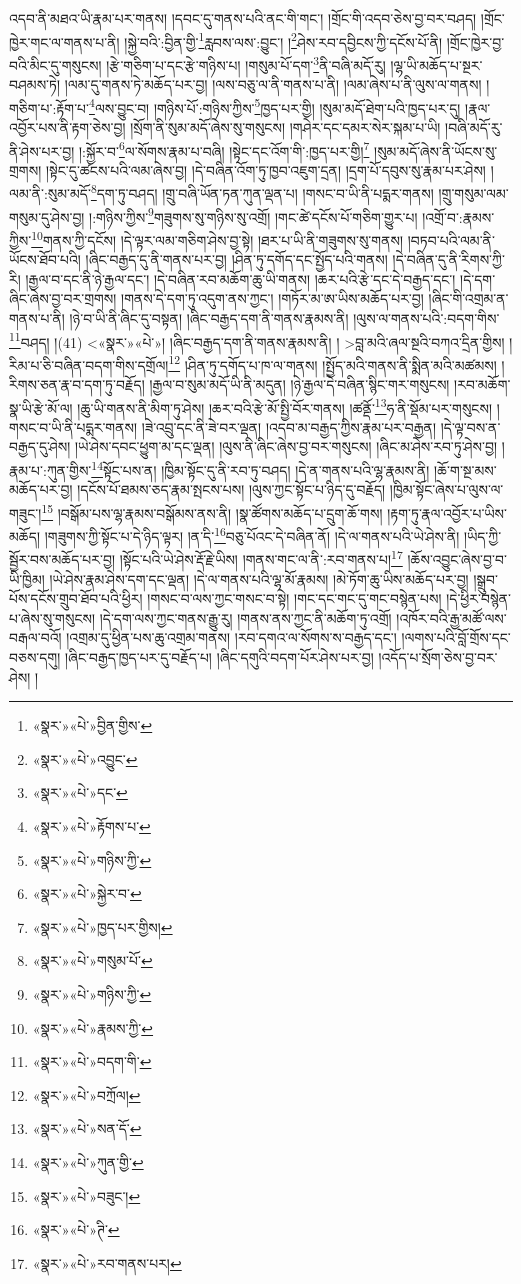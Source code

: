 འདབ་ནི་མཐའ་ཡི་རྣམ་པར་གནས། །དབང་དུ་གནས་པའི་ནང་གི་གང་། །གྲོང་གི་འདབ་ཅེས་བྱ་བར་བཤད། །གྲོང་ཁྱེར་གང་ལ་གནས་པ་ནི། །སྐྱེ་བའི་:བྱིན་གྱི་\footnote{«སྣར་»«པེ་»བྱིན་གྱིས་}རླབས་ལས་:བྱུང་། །\footnote{«སྣར་»«པེ་»འབྱུང་}ཤེས་རབ་དབྱིངས་ཀྱི་དངོས་པོ་ནི། །གྲོང་ཁྱེར་བྱ་བའི་མིང་དུ་གསུངས། །རྩེ་གཅིག་པ་དང་རྩེ་གཉིས་པ། །གསུམ་པོ་དག་\footnote{«སྣར་»«པེ་»དང་}ནི་བཞི་མདོ་རུ། །ལྷ་ཡི་མཆོད་པ་སྔར་བཤམས་ཏེ། །ལམ་དུ་གནས་ཏེ་མཆོད་པར་བྱ། །ལས་བཅུ་ལ་ནི་གནས་པ་ནི། །ལམ་ཞེས་པ་ནི་ལུས་ལ་གནས། །གཅིག་པ་:རྟོག་པ་\footnote{«སྣར་»«པེ་»རྟོགས་པ་}ལས་བྱུང་བ། །གཉིས་པོ་:གཉིས་ཀྱིས་\footnote{«སྣར་»«པེ་»གཉིས་ཀྱི་}ཁྱད་པར་གྱི། །སུམ་མདོ་ཐེག་པའི་ཁྱད་པར་དུ། །རྣལ་འབྱོར་པས་ནི་རྟག་ཅེས་བྱ། །སྲོག་ནི་སུམ་མདོ་ཞེས་སུ་གསུངས། །གཤེར་དང་དམར་སེར་སྐམ་པ་ཡི། །བཞི་མདོ་རུ་ནི་ཤེས་པར་བྱ། །:སྐྱོར་བ་\footnote{«སྣར་»«པེ་»སྐྱེར་བ་}ལ་སོགས་རྣམ་པ་བཞི། །སྟེང་དང་འོག་གི་:ཁྱད་པར་གྱི།\footnote{«སྣར་»«པེ་»ཁྱད་པར་གྱིས།} །སུམ་མདོ་ཞེས་ནི་ཡོངས་སུ་གྲགས། །སྟེང་དུ་ཚངས་པའི་ལམ་ཞེས་བྱ། །དེ་བཞིན་འོག་ཏུ་ཁྱབ་འཇུག་དྲན། །དྲག་པོ་དབུས་སུ་རྣམ་པར་ཤེས། །ལམ་ནི་:སུམ་མདོ་\footnote{«སྣར་»«པེ་»གསུམ་པོ་}དག་ཏུ་བཤད། །གྲུ་བཞི་ཡོན་ཏན་ཀུན་ལྡན་པ། །གསང་བ་ཡི་ནི་པདྨར་གནས། །གྲུ་གསུམ་ལམ་གསུམ་དུ་ཤེས་བྱ། །:གཉིས་ཀྱིས་\footnote{«སྣར་»«པེ་»གཉིས་ཀྱི་}གཟུགས་སུ་གཉིས་སུ་འགྲོ། །གང་ཚེ་དངོས་པོ་གཅིག་གྱུར་པ། །འགྲོ་བ་:རྣམས་ཀྱིས་\footnote{«སྣར་»«པེ་»རྣམས་ཀྱི་}གནས་ཀྱི་དངོས། །དེ་ལྟར་ལམ་གཅིག་ཤེས་བྱ་སྟེ། །ཐར་པ་ཡི་ནི་གཟུགས་སུ་གནས། །བཏབ་པའི་ལམ་ནི་ཡོངས་ཐོབ་པའི། །ཞིང་བརྒྱད་དུ་ནི་གནས་པར་བྱ། །ཤིན་ཏུ་དགོད་དང་སྤྱོད་པའི་གནས། །དེ་བཞིན་དུ་ནི་རིགས་ཀྱི་རི། །རྒྱལ་བ་དང་ནི་ཉེ་རྒྱལ་དང་། །དེ་བཞིན་རབ་མཆོག་ཆུ་ཡི་གནས། །ཆར་པའི་རྩེ་དང་དེ་བརྒྱད་དང་། །དེ་དག་ཞིང་ཞེས་བྱ་བར་གྲགས། །གནས་དེ་དག་ཏུ་འདུག་ནས་ཀྱང་། །གཏོར་མ་ཨ་ཡིས་མཆོད་པར་བྱ། །ཞིང་གི་འགྲམ་ན་གནས་པ་ནི། །ཉེ་བ་ཡི་ནི་ཞིང་དུ་བསྟན། །ཞིང་བརྒྱད་དག་ནི་གནས་རྣམས་ནི། །ལུས་ལ་གནས་པའི་:བདག་གིས་\footnote{«སྣར་»«པེ་»བདག་གི་}བཤད། །(41) <«སྣར་»«པེ་»། །ཞིང་བརྒྱད་དག་ནི་གནས་རྣམས་ནི། །
>བླ་མའི་ཞལ་སྔའི་བཀའ་དྲིན་གྱིས། །རིམ་པ་ཅི་བཞིན་བདག་གིས་དགྲོལ།\footnote{«སྣར་»«པེ་»བཀྲོལ།} །ཤིན་ཏུ་དགོད་པ་ཁ་ལ་གནས། །སྤྱོད་མའི་གནས་ནི་སྨིན་མའི་མཚམས། །རིགས་ཅན་རྣ་བ་དག་ཏུ་བརྗོད། །རྒྱལ་བ་སུམ་མདོ་ཡི་ནི་མདུན། །ཉེ་རྒྱལ་དེ་བཞིན་སྙིང་གར་གསུངས། །རབ་མཆོག་སྣ་ཡི་རྩེ་མོ་ལ། །ཆུ་ཡི་གནས་ནི་མིག་ཏུ་ཤེས། །ཆར་བའི་རྩེ་མོ་སྤྱི་བོར་གནས། །ཚནྡོ་\footnote{«སྣར་»«པེ་»སན་དོ་}ཧ་ནི་སྡོམ་པར་གསུངས། །གསང་བ་ཡི་ནི་པདྨར་གནས། །ཟེ་འབྲུ་དང་ནི་ཟེ་བར་ལྡན། །འདབ་མ་བརྒྱད་ཀྱིས་རྣམ་པར་བརྒྱན། །དེ་ལྟ་བས་ན་བརྒྱད་དུ་ཤེས། །ཡེ་ཤེས་དབང་ཕྱུག་མ་དང་ལྡན། །ལུས་ནི་ཞིང་ཞེས་བྱ་བར་གསུངས། །ཞིང་མ་ཤེས་རབ་ཏུ་ཤེས་བྱ། །རྣམ་པ་:ཀུན་གྱིས་\footnote{«སྣར་»«པེ་»ཀུན་གྱི་}སྟོང་པས་ན། །ཁྱིམ་སྟོང་དུ་ནི་རབ་ཏུ་བཤད། །དེ་ན་གནས་པའི་ལྷ་རྣམས་ནི། །ཆོ་ག་སྔ་མས་མཆོད་པར་བྱ། །དངོས་པོ་ཐམས་ཅད་རྣམ་སྤངས་པས། །ལུས་ཀྱང་སྟོང་པ་ཉིད་དུ་བརྗོད། །ཁྱིམ་སྟོང་ཞེས་པ་ལུས་ལ་གཟུང་།\footnote{«སྣར་»«པེ་»བཟུང་།} །བསྒོམ་པས་ལྷ་རྣམས་བསྒོམས་ནས་ནི། །སྣ་ཚོགས་མཆོད་པ་དྲུག་ཆོ་གས། །རྟག་ཏུ་རྣལ་འབྱོར་པ་ཡིས་མཆོད། །གཟུགས་ཀྱི་སྟོང་པ་དེ་ཉིད་ལྟར། །ན་དི་\footnote{«སྣར་»«པེ་»ཊི་}བཅུ་པོའང་དེ་བཞིན་ནོ། །དེ་ལ་གནས་པའི་ཡེ་ཤེས་ནི། །ཡིད་ཀྱི་སྦྱོར་བས་མཆོད་པར་བྱ། །སྟོང་པའི་ཡེ་ཤེས་རྡོ་རྗེ་ཡིས། །གནས་གང་ལ་ནི་:རབ་གནས་པ།\footnote{«སྣར་»«པེ་»རབ་གནས་པར།} །ཆོས་འབྱུང་ཞེས་བྱ་བ་ཡི་ཁྱིམ། །ཡེ་ཤེས་རྣམ་ཤེས་དག་དང་ལྡན། །དེ་ལ་གནས་པའི་ལྷ་མོ་རྣམས། །མེ་ཏོག་ཆུ་ཡིས་མཆོད་པར་བྱ། །སྒྲུབ་པོས་དངོས་གྲུབ་ཐོབ་པའི་ཕྱིར། །གསང་བ་ལས་ཀྱང་གསང་བ་སྟེ། །གང་དང་གང་དུ་གང་བསྙེན་པས། །དེ་ཕྱིར་བསྙེན་པ་ཞེས་སུ་གསུངས། །དེ་དག་ལས་ཀྱང་གནས་རྒྱུ་རུ། །གནས་ནས་ཀྱང་ནི་མཆོག་ཏུ་འགྲོ། །འཁོར་བའི་རྒྱ་མཚོ་ལས་བརྒལ་བའོ། །འགྲམ་དུ་ཕྱིན་པས་ཆུ་འགྲམ་གནས། །རབ་དགའ་ལ་སོགས་ས་བརྒྱད་དང་། །ལགས་པའི་བློ་གྲོས་དང་བཅས་དགུ། །ཞིང་བརྒྱད་ཁྱད་པར་དུ་བརྗོད་པ། །ཞིང་དགུའི་བདག་པོར་ཤེས་པར་བྱ། །འདོད་པ་སྲོག་ཅེས་བྱ་བར་ཤེས། །
